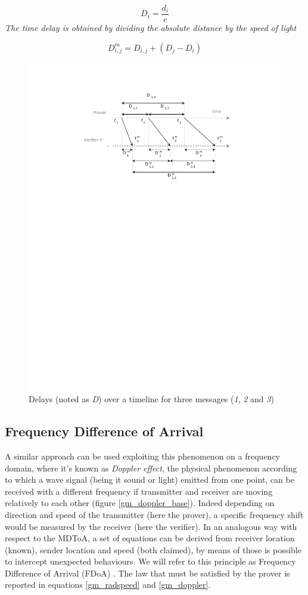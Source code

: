 \begin{equation}
    D_i = \frac{d_i}{c}
    \label{gm_delay}
\end{equation}
\emph{The time delay is obtained by dividing the absolute distance by the speed of light}

\begin{equation}
    D_{i,j}^m = D_{i,j} + (D_j - D_i)
    \label{gm_delay_trust}
\end{equation}

\begin{figure}
    \includegraphics[width=.47\textwidth,trim={46mm 177mm 40mm 20mm},clip]{gm_delay_pic}
    \caption{Delays (noted as \textit{D}) over a timeline for three messages (\textit{1}, \textit{2} and \textit{3}) \cite{schaefer15}}
    \label{gm_delay_pic}
\end{figure}

\subsection{Frequency Difference of Arrival} \label{gm_sec_fdoa}

A similar approach can be used exploiting this phenomenon on a frequency domain, where it's known as \textit{Doppler effect}, the physical phenomenon according to which a wave signal (being it sound or light) emitted from one point, can be received with a different frequency if transmitter and receiver are moving relatively to each other (figure \ref{gm_doppler_base}). Indeed depending on direction and speed of the transmitter (here the prover), a specific frequency shift would be measured by the receiver (here the verifier). In an analogous way with respect to the MDToA, a set of equations can be derived from receiver location (known), sender location and speed (both claimed), by means of those is possible to intercept unexpected behaviours. We will refer to this principle as Frequency Difference of Arrival (FDoA) \cite{schaefer16} \cite{ghose15}. The law that must be satisfied by the prover is reported in equations \eqref{gm_radspeed} and \eqref{gm_doppler}.

